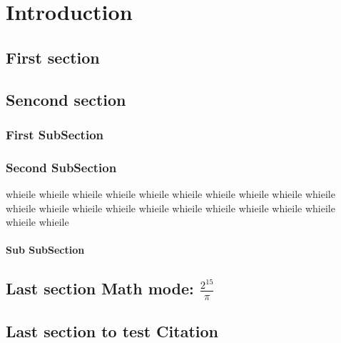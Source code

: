 \chapter{Introduction \protect\\ }
\lipsum[2]

\section{First section}
\lipsum[3]

\section{Sencond  section}
\lipsum[3]
\subsection{First SubSection}
\lipsum[3]
\subsection{Second SubSection}
\lipsum[3]
whieile whieile whieile whieile whieile whieile whieile whieile whieile whieile whieile whieile whieile whieile whieile whieile whieile whieile whieile whieile whieile whieile 

\newpage

\subsubsection{Sub SubSection}
\lipsum[3]	 
	 
\section{Last section Math mode: $\frac{2^{15}}{\pi}$} 
\lipsum[3]
\section{Last section to test Citation} 

